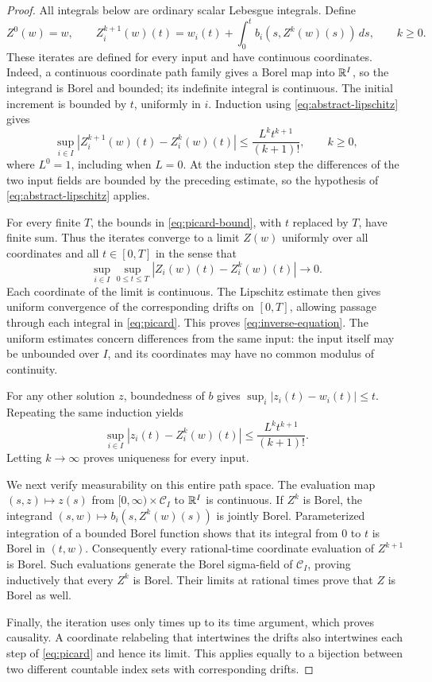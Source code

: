 \begin{proof}
All integrals below are ordinary scalar Lebesgue integrals.  Define
\begin{equation}\label{eq:picard}
 Z^0(w)=w,\qquad
 Z_i^{k+1}(w)(t)
 =w_i(t)+\int_0^t b_i(s,Z^k(w)(s))\,ds,
 \qquad k\ge0.
\end{equation}
These iterates are defined for every input and have continuous coordinates.
Indeed, a continuous coordinate path family gives a Borel map into
$\mathbb R^I$, so the integrand is Borel and bounded; its indefinite integral
is continuous.  The initial increment is bounded by $t$, uniformly in
$i$.  Induction using \eqref{eq:abstract-lipschitz} gives
\begin{equation}\label{eq:picard-bound}
 \sup_{i\in I}|Z_i^{k+1}(w)(t)-Z_i^k(w)(t)|
 \le \frac{L^k t^{k+1}}{(k+1)!},\qquad k\ge0,
\end{equation}
where $L^0=1$, including when $L=0$.  At the induction step the
differences of the two input fields are bounded by the preceding
estimate, so the hypothesis of \eqref{eq:abstract-lipschitz} applies.

For every finite $T$, the bounds in \eqref{eq:picard-bound}, with $t$
replaced by $T$, have finite sum.  Thus the iterates converge to a limit
$Z(w)$ uniformly over all coordinates and all $t\in[0,T]$ in the sense
that
\[
 \sup_{i\in I}\sup_{0\le t\le T}
 |Z_i(w)(t)-Z_i^k(w)(t)|\longrightarrow0.
\]
Each coordinate of the limit is continuous.  The Lipschitz estimate
then gives uniform convergence of the corresponding drifts on
$[0,T]$, allowing passage through each integral in \eqref{eq:picard}.
This proves \eqref{eq:inverse-equation}.
The uniform estimates concern differences from the same input: the
input itself may be unbounded over $I$, and its coordinates may have
no common modulus of continuity.

For any other solution $z$, boundedness of $b$ gives
$\sup_i|z_i(t)-w_i(t)|\le t$.  Repeating the same induction
yields
\[
 \sup_{i\in I}|z_i(t)-Z_i^k(w)(t)|
 \le \frac{L^k t^{k+1}}{(k+1)!}.
\]
Letting $k\to\infty$ proves uniqueness for every input.

We next verify measurability on this entire path space.  The evaluation
map $(s,z)\mapsto z(s)$ from $[0,\infty)\times\mathcal C_I$ to
$\mathbb R^I$ is continuous.  If $Z^k$ is Borel, the integrand
$(s,w)\mapsto b_i(s,Z^k(w)(s))$ is jointly Borel.  Parameterized
integration of a bounded Borel function shows that its integral from
$0$ to $t$ is Borel in $(t,w)$.  Consequently every rational-time
coordinate evaluation of $Z^{k+1}$ is Borel.  Such evaluations
generate the Borel sigma-field of $\mathcal C_I$, proving inductively
that every $Z^k$ is Borel.  Their limits at rational times prove that
$Z$ is Borel as well.

Finally, the iteration uses only times up to its time argument, which
proves causality.  A coordinate relabeling that intertwines the drifts
also intertwines each step of \eqref{eq:picard} and hence its limit.
This applies equally to a bijection between two different countable
index sets with corresponding drifts.
\end{proof}

